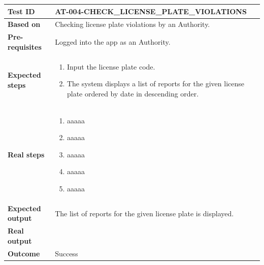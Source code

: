 \begin{table}[H]
    \centering
    \begin{tabular}{p{3cm}p{10cm}}
    \textbf{Test ID} & AT-004-CHECK\_LICENSE\_PLATE\_VIOLATIONS \\ \hline
    \textbf{Based on} & Checking license plate violations by an Authority. \\ \hline
    \textbf{Pre-requisites} & Logged into the app as an Authority. \\ \hline
    \textbf{Expected steps} & 
        \begin{enumerate} \itemsep0em
            \item Input the license plate code.
            \item The system displays a list of reports for the given license plate ordered by date in descending order.
        \end{enumerate} \\ \hline
    \textbf{Real steps} & 
        \begin{enumerate} \itemsep0em
            \item aaaaa
            \item aaaaa
            \item aaaaa
            \item aaaaa
            \item aaaaa
        \end{enumerate} \\ \hline
    \textbf{Expected output} & The list of reports for the given license plate is displayed. \\ \hline
    \textbf{Real output} &  \\ \hline
    \textbf{Outcome} & Success \\ \hline
    \end{tabular}
\end{table}

